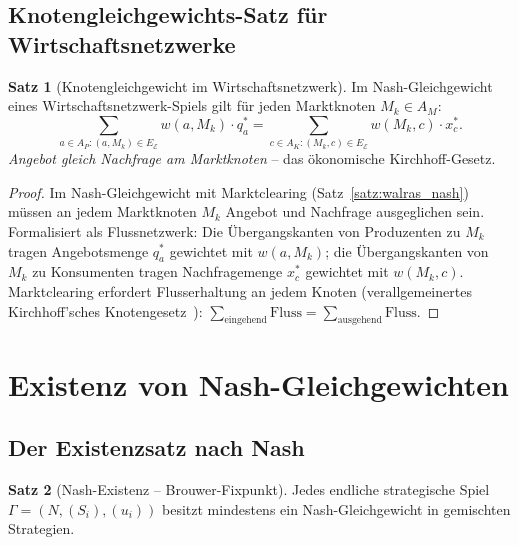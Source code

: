 ﻿\documentclass[a4paper,12pt]{article}
\theoremstyle{definition}
\newtheorem{satz}{Satz}
\begin{document}
\subsection{Knotengleichgewichts-Satz f\"ur Wirtschaftsnetzwerke}

\begin{satz}[Knotengleichgewicht im Wirtschaftsnetzwerk]
\label{satz:knotengleichgewicht}
Im Nash-Gleichgewicht eines Wirtschaftsnetzwerk-Spiels gilt f\"ur jeden
Marktknoten $M_k \in A_M$:
\[
\sum_{a \in A_P: (a,M_k) \in E_\mathcal{E}} w(a,M_k) \cdot q_a^*
= \sum_{c \in A_K: (M_k,c) \in E_\mathcal{E}} w(M_k,c) \cdot x_c^*.
\]
\emph{Angebot gleich Nachfrage am Marktknoten} -- das \"okonomische
Kirchhoff-Gesetz.
\end{satz}

\begin{proof}
Im Nash-Gleichgewicht mit Marktclearing (Satz~\ref{satz:walras_nash})
m\"ussen an jedem Marktknoten $M_k$ Angebot und Nachfrage ausgeglichen sein.
Formalisiert als Flussnetzwerk: Die \"Ubergangskanten von Produzenten zu
$M_k$ tragen Angebotsmenge $q_a^*$ gewichtet mit $w(a,M_k)$;
die \"Ubergangskanten von $M_k$ zu Konsumenten tragen Nachfragemenge $x_c^*$
gewichtet mit $w(M_k,c)$.
Marktclearing erfordert Flusserhaltung an jedem Knoten (verallgemeinertes
Kirchhoff'sches Knotengesetz~\cite{epp2026knoten}):
$\sum_{\text{eingehend}} \text{Fluss} = \sum_{\text{ausgehend}} \text{Fluss}$.
\end{proof}

\section{Existenz von Nash-Gleichgewichten}

\subsection{Der Existenzsatz nach Nash}

\begin{satz}[Nash-Existenz -- Brouwer-Fixpunkt]
\label{satz:nash_existenz}
Jedes endliche strategische Spiel $\Gamma = (N, (S_i), (u_i))$ besitzt
mindestens ein Nash-Gleichgewicht in gemischten Strategien.
\end{satz}
\end{document}
